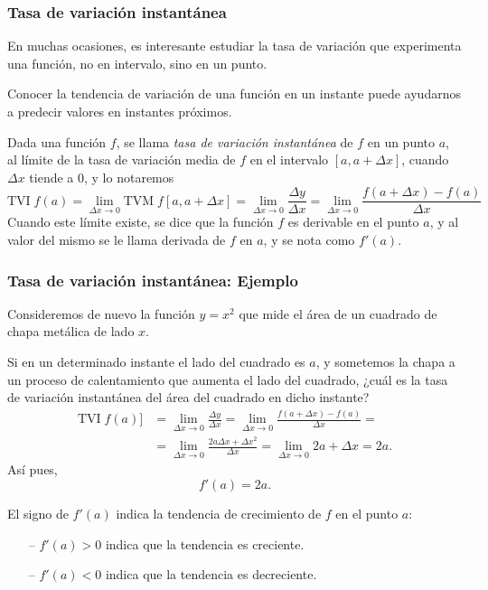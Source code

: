 \begin{frame}
\frametitle{Tasa de variación instantánea}
En muchas ocasiones, es interesante estudiar la tasa de variación que experimenta una función, no en intervalo, sino en un punto.

Conocer la tendencia de variación de una función en un instante puede ayudarnos a predecir valores en instantes próximos.

\begin{definicion}
Dada una función $f$, se llama \emph{tasa de variación instantánea} de $f$ en un punto $a$, al límite de la tasa de variación media de $f$ en el intervalo $[a,a+\Delta x]$, cuando $\Delta x$ tiende a 0, y lo notaremos
\[
\textrm{TVI}\;f (a)=\lim_{\Delta x\rightarrow 0} \textrm{TVM}\; f[a,a+\Delta x]=\lim_{\Delta x\rightarrow 0}\frac{\Delta y}{\Delta x}=\lim_{\Delta x\rightarrow 0}\frac{f(a+\Delta x)-f(a)}{\Delta x} 
\]
Cuando este límite existe, se dice que la función $f$ es derivable en el punto $a$, y al valor del mismo se le llama derivada de $f$ en $a$, y se nota como $f'(a)$.
\end{definicion}
\end{frame}


\begin{frame}
\frametitle{Tasa de variación instantánea: Ejemplo}
Consideremos de nuevo la función $y=x^2$ que mide el área de un cuadrado de chapa metálica de lado $x$.

Si en un determinado instante el lado del cuadrado es $a$, y sometemos la chapa a un proceso de calentamiento que aumenta el lado del cuadrado, ¿cuál es la tasa de variación instantánea del área del cuadrado en dicho instante?
\begin{align*}
\textrm{TVI}\;f(a)]&=\lim_{\Delta x\rightarrow 0}\frac{\Delta y}{\Delta x}=\lim_{\Delta x\rightarrow 0}\frac{f(a+\Delta x)-f(a)}{\Delta x} =\\
&=\lim_{\Delta x\rightarrow 0}\frac{2a\Delta x+\Delta x^2}{\Delta x}=\lim_{\Delta x\rightarrow 0} 2a+\Delta x= 2a. 
\end{align*}
Así pues,
\[
f'(a)=2a.
\]

El signo de $f'(a)$ indica la tendencia de crecimiento de $f$ en el punto $a$:
\begin{itemize}
\item[--]  $f'(a)>0$ indica que la tendencia es creciente.
\item[--]  $f'(a)<0$ indica que la tendencia es decreciente.
\end{itemize}
\end{frame}


